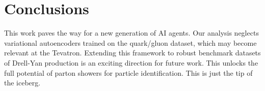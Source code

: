 \section{Conclusions}\label{sec:conclusions}

This work paves the way for a new generation of AI agents. Our analysis
neglects variational autoencoders trained on the quark/gluon dataset,
which may become relevant at the Tevatron. Extending this framework to
robust benchmark datasets of Drell-Yan production is an exciting
direction for future work. This unlocks the full potential of parton
showers for particle identification. This is just the tip of the
iceberg.

